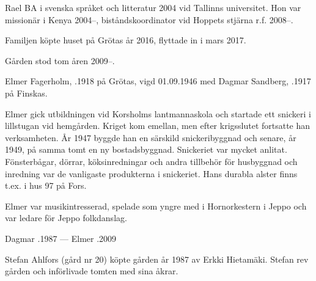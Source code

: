 Rael BA i svenska språket och litteratur 2004 vid Tallinns universitet. Hon var missionär i Kenya 2004--, biståndskoordinator vid Hoppets stjärna r.f. 2008--.
\begin{jhchildren}
  \item {}
  \item {}
\end{jhchildren}
Familjen köpte huset på Grötas år 2016, flyttade in i mars 2017.


Gården stod tom åren 2009--.\jhvspace{}


Elmer Fagerholm, .1918 på Grötas, vigd 01.09.1946 med Dagmar Sandberg, .1917 på Finskas.
\begin{jhchildren}
  \item {}
  \item {}
\end{jhchildren}

Elmer gick utbildningen vid Korsholms lantmannaskola och startade ett snickeri i lillstugan vid hemgården. Kriget kom emellan, men efter krigsslutet fortsatte han verksamheten. År 1947 byggde han en särskild snickeribyggnad och senare, år 1949, på samma tomt en ny bostadsbyggnad. Snickeriet var mycket anlitat. Fönsterbågar, dörrar, köksinredningar och andra tillbehör för husbyggnad och inredning var de vanligaste produkterna i snickeriet. Hans durabla alster finns t.ex. i hus 97 på Fors.

Elmer var musikintresserad, spelade som yngre med i Hornorkestern i Jeppo och var ledare för Jeppo folkdanslag.

Dagmar .1987  ---  Elmer .2009






Stefan Ahlfors (gård nr 20) köpte gården år 1987 av Erkki Hietamäki. Stefan rev gården och införlivade tomten med sina åkrar.\jhvspace{}


